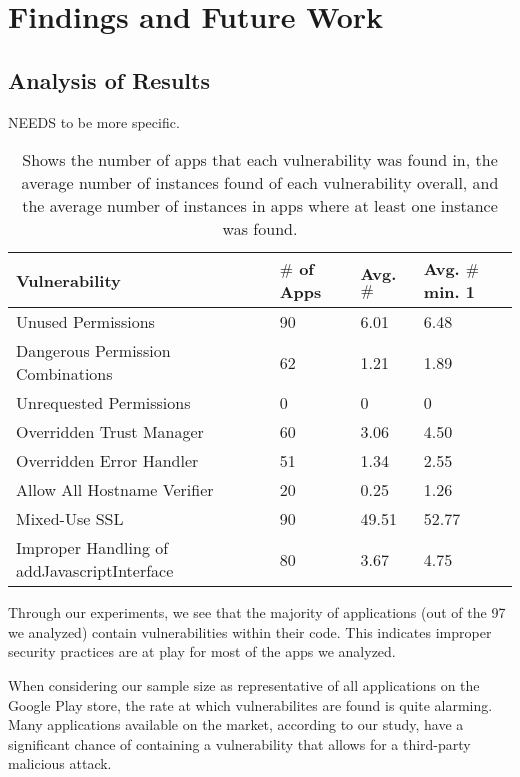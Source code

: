 \section{Findings and Future Work}
\label{sec:relwork}

\subsection{Analysis of Results}

NEEDS to be more specific.\\

\begin{table}
    \centering
    \begin{tabular}{| m{4cm} | m{0.75cm}| m{0.75cm} | m{0.75cm} |} \hline
        Vulnerability & $\#$ of Apps & Avg. $\#$ & Avg. $\#$ min. 1\\ \hline
        Unused Permissions & 90 & 6.01 & 6.48\\ \hline
        Dangerous Permission Combinations & 62 & 1.21 & 1.89\\ \hline            
        Unrequested Permissions & 0 & 0 & 0\\ \hline
        Overridden Trust Manager & 60 & 3.06 & 4.50\\ \hline
        Overridden Error Handler & 51  & 1.34 & 2.55\\ \hline
        Allow All Hostname Verifier & 20 & 0.25 & 1.26\\ \hline
        Mixed-Use SSL& 90 & 49.51 & 52.77 \\ \hline
        Improper Handling of addJavascriptInterface & 80 & 3.67 & 4.75 \\ \hline
    \end{tabular}
    \caption{Shows the number of apps that each vulnerability was found in, the average number of instances found of each vulnerability overall, and the average number of instances in apps where at least one instance was found.}
    \label{tab:my_label}
\end{table}

Through our experiments, we see that the majority of applications
(out of the 97 we analyzed) contain vulnerabilities within their
code. This indicates improper security practices are at play for 
most of the apps we analyzed.

When considering our sample size as representative of all 
applications on the Google Play store, the rate at which 
vulnerabilites are found is quite alarming. Many applications
available on the market, according to our study, have a significant 
chance of containing a vulnerability that allows for a third-party 
malicious attack.

